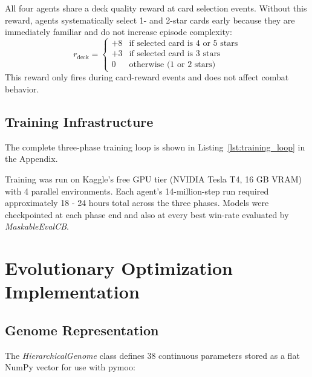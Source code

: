 All four agents share a deck quality reward at card selection events. Without this reward, agents systematically select 1- and 2-star cards early because they are immediately familiar and do not increase episode complexity:
\begin{equation}
r_{\text{deck}} = \begin{cases}
+8 & \text{if selected card is 4 or 5 stars} \\
+3 & \text{if selected card is 3 stars} \\
0  & \text{otherwise (1 or 2 stars)}
\end{cases}
\end{equation}
This reward only fires during card-reward events and does not affect combat behavior.

\subsection{Training Infrastructure}

The complete three-phase training loop is shown in Listing~\ref{lst:training_loop} in the Appendix.

Training was run on Kaggle's free GPU tier (NVIDIA Tesla T4, 16 GB VRAM) with 4 parallel environments. Each agent's 14-million-step run required approximately 18 - 24 hours total across the three phases. Models were checkpointed at each phase end and also at every best win-rate evaluated by \textit{MaskableEvalCB}.

\section{Evolutionary Optimization Implementation}

\subsection{Genome Representation}

The \textit{HierarchicalGenome} class defines 38 continuous parameters stored as a flat NumPy vector for use with pymoo:

